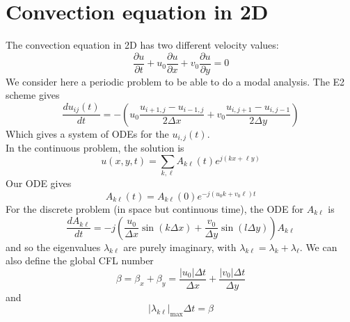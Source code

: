 \documentclass[12pt, openany]{report}
\theoremstyle{definition}
\begin{document}
\section{Convection equation in 2D}
The convection equation in 2D has two different velocity values:
\begin{equation}
	\frac{\partial u}{\partial t} + u_0 \frac{\partial u}{\partial x} + v_0 \frac{\partial u}{\partial y} = 0
\end{equation}
We consider here a periodic problem to be able to do a modal analysis. 
The E2 scheme gives 
\begin{equation}
	\frac{du_{ij}(t)}{dt} = -\left(u_0\frac{u_{i+1,j}-u_{i-1,j}}{2\Delta x} + v_0 \frac{u_{i,j+1}-u_{i,j-1}}{2\Delta y}\right)
\end{equation}
Which gives a system of ODEs for the $u_{i,j}(t)$. \\
In the continuous problem, the solution is 
\begin{equation}
	u(x,y,t) = \sum_{k,\ell} A_{k\ell}(t) e^{j(kx+\ell y)}
\end{equation}
Our ODE gives 
\begin{equation}
	A_{k\ell }(t) = A_{k\ell}(0) e^{-j(u_0k+v_0\ell)t}
\end{equation}
For the discrete problem (in space but continuous time), the ODE for $A_{k\ell}$ is 
\begin{equation}
	\frac{dA_{k\ell}}{dt} = -j\left(\frac{u_0}{\Delta x} \sin(k\Delta x) + \frac{v_0}{\Delta y}\sin(l\Delta y)\right) A_{k\ell}
\end{equation}
and so the eigenvalues $\lambda_{k\ell}$ are purely imaginary, with $\lambda_{k\ell} = \lambda_k + \lambda_\ell$. We can also define the global CFL number 
\begin{equation}
	\beta = \beta_x + \beta_y = \frac{|u_0|\Delta t}{\Delta x} + \frac{|v_0|\Delta t}{\Delta y}
\end{equation}
and 
\begin{equation}
	|\lambda_{k\ell}|_{\max} \Delta t = \beta 
\end{equation}
\end{document}
